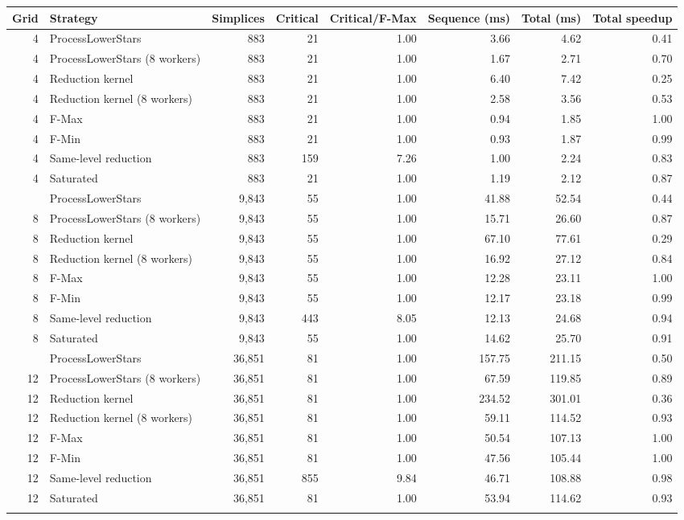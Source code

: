 \begin{tabular}{rlrrrrrr}
\toprule
Grid & Strategy & Simplices & Critical & Critical/F-Max & Sequence (ms) & Total (ms) & Total speedup \\
\midrule
4 & ProcessLowerStars & 883 & 21 & 1.00 & 3.66 & 4.62 & 0.41 \\
4 & ProcessLowerStars (8 workers) & 883 & 21 & 1.00 & 1.67 & 2.71 & 0.70 \\
4 & Reduction kernel & 883 & 21 & 1.00 & 6.40 & 7.42 & 0.25 \\
4 & Reduction kernel (8 workers) & 883 & 21 & 1.00 & 2.58 & 3.56 & 0.53 \\
4 & F-Max & 883 & 21 & 1.00 & 0.94 & 1.85 & 1.00 \\
4 & F-Min & 883 & 21 & 1.00 & 0.93 & 1.87 & 0.99 \\
4 & Same-level reduction & 883 & 159 & 7.26 & 1.00 & 2.24 & 0.83 \\
4 & Saturated & 883 & 21 & 1.00 & 1.19 & 2.12 & 0.87 \\
\addlinespace
8 & ProcessLowerStars & 9,843 & 55 & 1.00 & 41.88 & 52.54 & 0.44 \\
8 & ProcessLowerStars (8 workers) & 9,843 & 55 & 1.00 & 15.71 & 26.60 & 0.87 \\
8 & Reduction kernel & 9,843 & 55 & 1.00 & 67.10 & 77.61 & 0.29 \\
8 & Reduction kernel (8 workers) & 9,843 & 55 & 1.00 & 16.92 & 27.12 & 0.84 \\
8 & F-Max & 9,843 & 55 & 1.00 & 12.28 & 23.11 & 1.00 \\
8 & F-Min & 9,843 & 55 & 1.00 & 12.17 & 23.18 & 0.99 \\
8 & Same-level reduction & 9,843 & 443 & 8.05 & 12.13 & 24.68 & 0.94 \\
8 & Saturated & 9,843 & 55 & 1.00 & 14.62 & 25.70 & 0.91 \\
\addlinespace
12 & ProcessLowerStars & 36,851 & 81 & 1.00 & 157.75 & 211.15 & 0.50 \\
12 & ProcessLowerStars (8 workers) & 36,851 & 81 & 1.00 & 67.59 & 119.85 & 0.89 \\
12 & Reduction kernel & 36,851 & 81 & 1.00 & 234.52 & 301.01 & 0.36 \\
12 & Reduction kernel (8 workers) & 36,851 & 81 & 1.00 & 59.11 & 114.52 & 0.93 \\
12 & F-Max & 36,851 & 81 & 1.00 & 50.54 & 107.13 & 1.00 \\
12 & F-Min & 36,851 & 81 & 1.00 & 47.56 & 105.44 & 1.00 \\
12 & Same-level reduction & 36,851 & 855 & 9.84 & 46.71 & 108.88 & 0.98 \\
12 & Saturated & 36,851 & 81 & 1.00 & 53.94 & 114.62 & 0.93 \\
\addlinespace
\bottomrule
\end{tabular}

